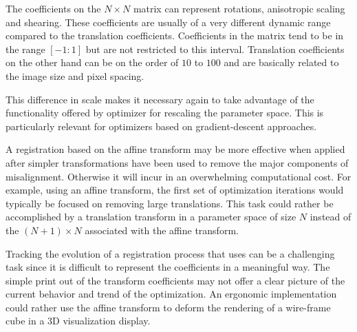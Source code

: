 The coefficients on the $N \times N$ matrix can represent rotations,
anisotropic scaling and shearing. These coefficients are usually of a very
different dynamic range compared to the translation coefficients. Coefficients in the 
matrix tend to be in the range $[-1:1]$ but are not restricted to this interval.
Translation coefficients on the other hand can be on the order of $10$ to $100$ and
are basically related to the image size and pixel spacing.

This difference in scale makes it necessary again to take advantage of the
functionality offered by optimizer for rescaling the parameter space. This is
particularly relevant for optimizers based on gradient-descent approaches.

A registration based on the affine transform may be more effective when applied
after simpler transformations have been used to remove the major components of
misalignment. Otherwise it will incur in an overwhelming computational
cost. For example, using an affine transform, the first set of optimization
iterations would typically be focused on removing large translations. This task
could rather be accomplished by a translation transform in a parameter space of
size $N$ instead of the $(N+1) \times N$ associated with the affine transform.

Tracking the evolution of a registration process that uses
 can be a challenging task since it is difficult to
represent the coefficients in a meaningful way.  The simple print out of the
transform coefficients may not offer a clear picture of the current behavior
and trend of the optimization.  An ergonomic implementation could rather use
the affine transform to deform the rendering of a wire-frame cube in a 3D
visualization display.


